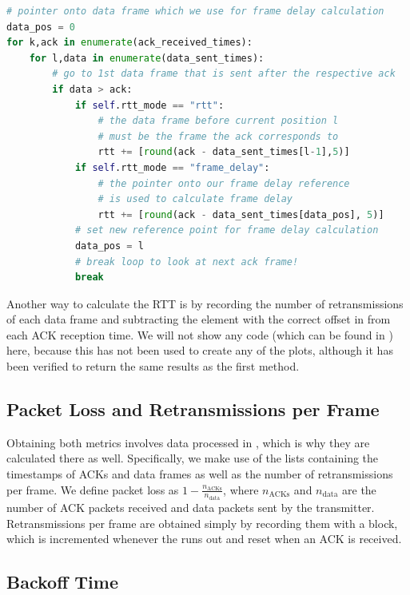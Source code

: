 \begin{lstlisting}[language=Python, caption=The method used in \code{rtt\_alternative.py} to calculate RTT and frame delay,label=lst:rtt]
# pointer onto data frame which we use for frame delay calculation
data_pos = 0
for k,ack in enumerate(ack_received_times):
    for l,data in enumerate(data_sent_times):
		# go to 1st data frame that is sent after the respective ack 
        if data > ack:
            if self.rtt_mode == "rtt":
				# the data frame before current position l 
				# must be the frame the ack corresponds to
                rtt += [round(ack - data_sent_times[l-1],5)]
            if self.rtt_mode == "frame_delay":
				# the pointer onto our frame delay reference
				# is used to calculate frame delay
                rtt += [round(ack - data_sent_times[data_pos], 5)]
			# set new reference point for frame delay calculation
            data_pos = l
			# break loop to look at next ack frame!
            break
\end{lstlisting} 

Another way to calculate the RTT is by recording the number of retransmissions of each data frame and subtracting the element with the correct offset in  from each ACK reception time. We will not show any code (which can be found in ) here, because this has not been used to create any of the plots, although it has been verified to return the same results as the first method. 

\subsection{Packet Loss and Retransmissions per Frame}

Obtaining both metrics involves data processed in , which is why they are calculated there as well. Specifically, we make use of the lists containing the timestamps of ACKs and data frames as well as the number of retransmissions per frame. 
We define packet loss as $ 1 - \frac{n_\text{ACKs}}{n_\text{data}} $, where $ n_\text{ACKs} $ and $ n_\text{data} $ are the number of ACK packets received and data packets sent by the transmitter.
Retransmissions per frame are obtained simply by recording them with a  block, which is incremented whenever the  runs out and reset when an ACK is received.

\subsection{Backoff Time}

